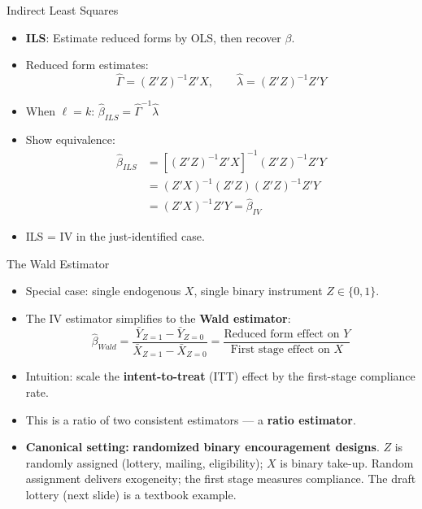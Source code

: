 \documentclass[aspectratio=169, handout]{beamer}
\numberwithin{equation}{section}
\begin{document}
\begin{frame}{Indirect Least Squares}
\begin{itemize}
\item \textbf{ILS}: Estimate reduced forms by OLS, then recover $\beta$.
\item Reduced form estimates:
$$\hat{\Gamma} = (Z'Z)^{-1}Z'X, \qquad \hat{\lambda} = (Z'Z)^{-1}Z'Y$$
\item When $\ell=k$: $\hat{\beta}_{ILS} = \hat{\Gamma}^{-1}\hat{\lambda}$
\item Show equivalence:
\begin{align*}
\hat{\beta}_{ILS} &= [(Z'Z)^{-1}Z'X]^{-1}(Z'Z)^{-1}Z'Y\\
&= (Z'X)^{-1}(Z'Z)(Z'Z)^{-1}Z'Y\\
&= (Z'X)^{-1}Z'Y = \hat{\beta}_{IV}
\end{align*}
\item ILS = IV in the just-identified case.
\end{itemize}
\end{frame}


\begin{frame}{The Wald Estimator}
\begin{itemize}
\item Special case: single endogenous $X$, single binary instrument $Z\in\{0,1\}$.
\item The IV estimator simplifies to the \textbf{Wald estimator}:
$$\hat{\beta}_{Wald} = \frac{\bar{Y}_{Z=1}-\bar{Y}_{Z=0}}{\bar{X}_{Z=1}-\bar{X}_{Z=0}} = \frac{\text{Reduced form effect on } Y}{\text{First stage effect on } X}$$
\item Intuition: scale the \textbf{intent-to-treat} (ITT) effect by the first-stage compliance rate.
\item This is a ratio of two consistent estimators --- a \textbf{ratio estimator}.
\item \textbf{Canonical setting:} \textbf{randomized binary encouragement designs}. $Z$ is randomly assigned (lottery, mailing, eligibility); $X$ is binary take-up. Random assignment delivers exogeneity; the first stage measures compliance. The draft lottery (next slide) is a textbook example.
\end{itemize}
\end{frame}
\end{document}
